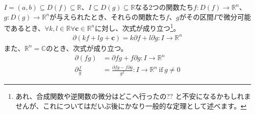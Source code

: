 \documentclass[dvipdfmx]{jsarticle}
\begin{document}
\begin{thm}\label{4.2.1.4}
$I = (a,b) \subseteq D(f) \subseteq \mathbb{R}$、$I \subseteq D(g) \subseteq \mathbb{R}$なる2つの関数たち$f:D(f) \rightarrow \mathbb{R}^{n}$、$g:D(g) \rightarrow \mathbb{R}^{n}$が与えられたとき、それらの関数たち$f$、$g$がその区間$I$で微分可能であるとき、$\forall k,l \in \mathbb{R}\forall\mathbf{c} \in \mathbb{R}^{n}$に対し、次式が成り立つ\footnote{あれ、合成関数や逆関数の微分はどこへ行ったの?? と不安になるかもしれませんが、これについてはだいぶ後にかなり一般的な定理として述べます。}。
\begin{align*}
\partial\left( kf + lg + \mathbf{c} \right) = k\partial f + l\partial g:I \rightarrow \mathbb{R}^{n}
\end{align*}
また、$\mathbb{R}^{n} = \mathbb{C}$のとき、次式が成り立つ。
\begin{align*}
\partial(fg) &= \partial fg + f\partial g:I \rightarrow \mathbb{R}^{n}\\
\partial\frac{f}{g} &= \frac{\partial fg - f\partial g}{g^{2}}:I \rightarrow \mathbb{R}^{n}\ \mathrm{if}\ g \neq 0
\end{align*}
\end{thm}
\end{document}
